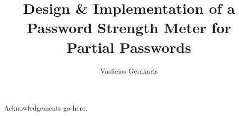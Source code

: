 \documentclass[msc, logo, parskip, abbrevs, notimes, twoside]{infthesis}  %
\title{Design \& Implementation of a Password Strength Meter for Partial Passwords}
\author{Vasileios Gerakaris}
\begin{document}
\begin{preliminary}

  \maketitle

  \begin{acknowledgements}
  Acknowledgements go here.
  \end{acknowledgements}

  \standarddeclaration


  \tableofcontents

\end{preliminary}







\begin{appendices}


\end{appendices}





\end{document}
